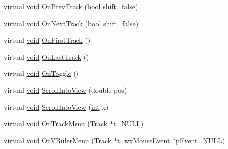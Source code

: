 \begin{DoxyCompactItemize}
\item 
virtual \hyperlink{sound_8c_ae35f5844602719cf66324f4de2a658b3}{void} \hyperlink{class_track_panel_a47315148ac50d0e24e7d88148973c8c4}{On\+Prev\+Track} (\hyperlink{mac_2config_2i386_2lib-src_2libsoxr_2soxr-config_8h_abb452686968e48b67397da5f97445f5b}{bool} shift=\hyperlink{mac_2config_2i386_2lib-src_2libsoxr_2soxr-config_8h_a65e9886d74aaee76545e83dd09011727}{false})
\item 
virtual \hyperlink{sound_8c_ae35f5844602719cf66324f4de2a658b3}{void} \hyperlink{class_track_panel_ae6a78ddc3629f49a13437566200a4f95}{On\+Next\+Track} (\hyperlink{mac_2config_2i386_2lib-src_2libsoxr_2soxr-config_8h_abb452686968e48b67397da5f97445f5b}{bool} shift=\hyperlink{mac_2config_2i386_2lib-src_2libsoxr_2soxr-config_8h_a65e9886d74aaee76545e83dd09011727}{false})
\item 
virtual \hyperlink{sound_8c_ae35f5844602719cf66324f4de2a658b3}{void} \hyperlink{class_track_panel_ad7d4d03f2c4fbd4ef33f28516393e3bb}{On\+First\+Track} ()
\item 
virtual \hyperlink{sound_8c_ae35f5844602719cf66324f4de2a658b3}{void} \hyperlink{class_track_panel_abe951b289ba3dd163e6b6245a6882450}{On\+Last\+Track} ()
\item 
virtual \hyperlink{sound_8c_ae35f5844602719cf66324f4de2a658b3}{void} \hyperlink{class_track_panel_ab45148d97e7869c58a2790594eba71b6}{On\+Toggle} ()
\item 
virtual \hyperlink{sound_8c_ae35f5844602719cf66324f4de2a658b3}{void} \hyperlink{class_track_panel_ad2d01414992d10f78ada48e6c290f180}{Scroll\+Into\+View} (double pos)
\item 
virtual \hyperlink{sound_8c_ae35f5844602719cf66324f4de2a658b3}{void} \hyperlink{class_track_panel_a4853e85fabe1bd526688961b300fdf9d}{Scroll\+Into\+View} (\hyperlink{xmltok_8h_a5a0d4a5641ce434f1d23533f2b2e6653}{int} x)
\item 
virtual \hyperlink{sound_8c_ae35f5844602719cf66324f4de2a658b3}{void} \hyperlink{class_track_panel_a54694a29a7c857cb7e59c1dcfcca4676}{On\+Track\+Menu} (\hyperlink{class_track}{Track} $\ast$\hyperlink{octave__test_8m_aaccc9105df5383111407fd5b41255e23}{t}=\hyperlink{px__mixer_8h_a070d2ce7b6bb7e5c05602aa8c308d0c4}{N\+U\+LL})
\item 
virtual \hyperlink{sound_8c_ae35f5844602719cf66324f4de2a658b3}{void} \hyperlink{class_track_panel_aa7ce99297da3ad97709404c89f625bb1}{On\+V\+Ruler\+Menu} (\hyperlink{class_track}{Track} $\ast$\hyperlink{octave__test_8m_aaccc9105df5383111407fd5b41255e23}{t}, wx\+Mouse\+Event $\ast$p\+Event=\hyperlink{px__mixer_8h_a070d2ce7b6bb7e5c05602aa8c308d0c4}{N\+U\+LL})

\end{DoxyCompactItemize}
